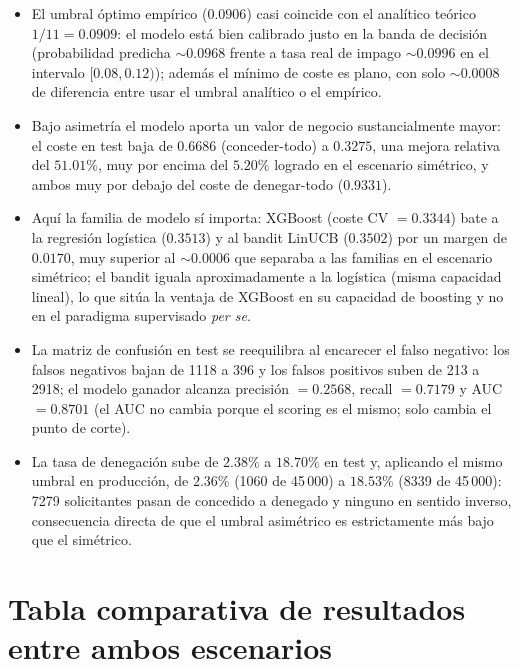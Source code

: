 \documentclass[11pt,a4paper]{article}
\begin{document}
\begin{itemize}
\item El umbral \'optimo emp\'irico ($0.0906$) casi coincide con el anal\'itico te\'orico
$1/11=0.0909$: el modelo est\'a bien calibrado justo en la banda de decisi\'on (probabilidad
predicha $\sim 0.0968$ frente a tasa real de impago $\sim 0.0996$ en el intervalo
$[0.08,0.12)$); adem\'as el m\'inimo de coste es plano, con solo $\sim 0.0008$ de diferencia
entre usar el umbral anal\'itico o el emp\'irico.
\item Bajo asimetr\'ia el modelo aporta un valor de negocio sustancialmente mayor: el coste
en test baja de $0.6686$ (conceder-todo) a $0.3275$, una mejora relativa del $51.01\%$, muy
por encima del $5.20\%$ logrado en el escenario sim\'etrico, y ambos muy por debajo del coste
de denegar-todo ($0.9331$).
\item Aqu\'i la familia de modelo s\'i importa: XGBoost (coste CV $=0.3344$) bate a la
regresi\'on log\'istica ($0.3513$) y al bandit LinUCB ($0.3502$) por un margen de $0.0170$,
muy superior al $\sim 0.0006$ que separaba a las familias en el escenario sim\'etrico; el
bandit iguala aproximadamente a la log\'istica (misma capacidad lineal), lo que sit\'ua la
ventaja de XGBoost en su capacidad de boosting y no en el paradigma supervisado \emph{per se}.
\item La matriz de confusi\'on en test se reequilibra al encarecer el falso negativo: los
falsos negativos bajan de 1118 a 396 y los falsos positivos suben de 213 a 2918; el modelo
ganador alcanza precisi\'on $=0.2568$, recall $=0.7179$ y AUC $=0.8701$ (el AUC no cambia
porque el scoring es el mismo; solo cambia el punto de corte).
\item La tasa de denegaci\'on sube de $2.38\%$ a $18.70\%$ en test y, aplicando el mismo
umbral en producci\'on, de $2.36\%$ (1060 de 45\,000) a $18.53\%$ (8339 de 45\,000): 7279
solicitantes pasan de concedido a denegado y ninguno en sentido inverso, consecuencia directa
de que el umbral asim\'etrico es estrictamente m\'as bajo que el sim\'etrico.
\end{itemize}

\section{Tabla comparativa de resultados entre ambos escenarios}
\end{document}
